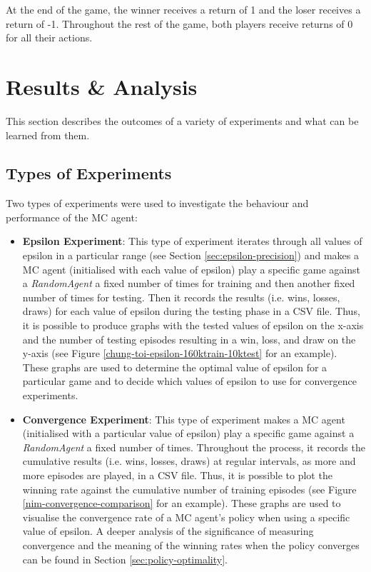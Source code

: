 \documentclass[11pt,a4paper]{report}
\begin{document}
At the end of the game, the winner receives a return of 1 and the loser receives a return of -1. Throughout the rest of the game, both players receive returns of 0 for all their actions.


\chapter{Results \& Analysis}

This section describes the outcomes of a variety of experiments and what can be learned from them.


\section{Types of Experiments}
\label{sec:experiment-types}

Two types of experiments were used to investigate the behaviour and performance of the MC agent:

\begin{itemize}

	\item \textbf{Epsilon Experiment}: This type of experiment iterates through all values of epsilon in a particular range (see Section \ref{sec:epsilon-precision}) and makes a MC agent (initialised with each value of epsilon) play a specific game against a \emph{RandomAgent} a fixed number of times for training and then another fixed number of times for testing. Then it records the results (i.e. wins, losses, draws) for each value of epsilon during the testing phase in a CSV file. Thus, it is possible to produce graphs with the tested values of epsilon on the x-axis and the number of testing episodes resulting in a win, loss, and draw on the y-axis (see Figure \ref{chung-toi-epsilon-160ktrain-10ktest} for an example). These graphs are used to determine the optimal value of epsilon for a particular game and to decide which values of epsilon to use for convergence experiments.

	\item \textbf{Convergence Experiment}: This type of experiment makes a MC agent (initialised with a particular value of epsilon) play a specific game against a \emph{RandomAgent} a fixed number of times. Throughout the process, it records the cumulative results (i.e. wins, losses, draws) at regular intervals, as more and more episodes are played, in a CSV file. Thus, it is possible to plot the winning rate against the cumulative number of training episodes (see Figure \ref{nim-convergence-comparison} for an example). These graphs are used to visualise the convergence rate of a MC agent's policy when using a specific value of epsilon. A deeper analysis of the significance of measuring convergence and the meaning of the winning rates when the policy converges can be found in Section \ref{sec:policy-optimality}.

\end{itemize}
\end{document}
